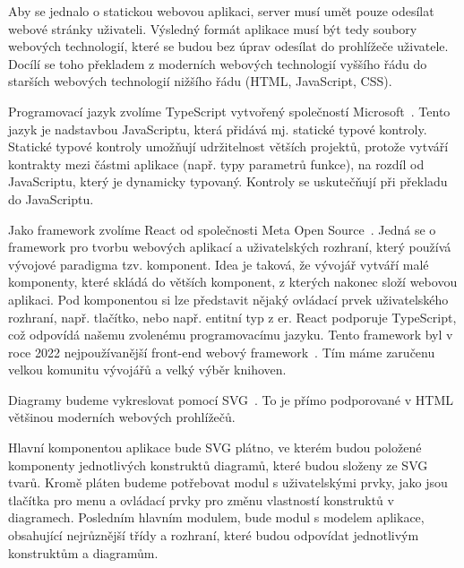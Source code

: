 Aby se jednalo o statickou webovou aplikaci, server musí umět pouze odesílat webové stránky uživateli.
Výsledný formát aplikace musí být tedy soubory webových technologií, které se budou bez úprav odesílat do prohlížeče uživatele.
Docílí se toho překladem z moderních webových technologií vyššího řádu do starších webových technologií nižšího řádu (HTML, JavaScript, CSS).

Programovací jazyk zvolíme TypeScript vytvořený společností Microsoft~\cite{microsoft_typescriptjavascript_2023}.
Tento jazyk je nadstavbou JavaScriptu, která přidává mj. statické typové kontroly.
Statické typové kontroly umožňují udržitelnost větších projektů, protože vytváří kontrakty mezi částmi aplikace (např. typy parametrů funkce), na rozdíl od JavaScriptu, který je dynamicky typovaný.
Kontroly se uskutečňují při překladu do JavaScriptu.

Jako framework zvolíme React od společnosti Meta Open Source~\cite{react_2023}.
Jedná se o framework pro tvorbu webových aplikací a uživatelských rozhraní, který používá vývojové paradigma tzv. komponent.
Idea je taková, že vývojář vytváří malé komponenty, které skládá do větších komponent, z kterých nakonec složí webovou aplikaci.
Pod komponentou si lze představit nějaký ovládací prvek uživatelského rozhraní, např. tlačítko, nebo např. entitní typ z \acrshort{er}.
React podporuje TypeScript, což odpovídá našemu zvolenému programovacímu jazyku.
Tento framework byl v roce 2022 nejpoužívanější front-end webový framework~\cite{stackoverflow_developersurvey_2022}.
Tím máme zaručenu velkou komunitu vývojářů a velký výběr knihoven.

Diagramy budeme vykreslovat pomocí SVG~\cite{brinza_svg_2018}.
To je přímo podporované v HTML většinou moderních webových prohlížečů.

Hlavní komponentou aplikace bude SVG plátno, ve kterém budou položené komponenty jednotlivých konstruktů diagramů, které budou složeny ze SVG tvarů.
Kromě pláten budeme potřebovat modul s uživatelskými prvky, jako jsou tlačítka pro menu a ovládací prvky pro změnu vlastností konstruktů v diagramech.
Posledním hlavním modulem, bude modul s modelem aplikace, obsahující nejrůznější třídy a rozhraní, které budou odpovídat jednotlivým konstruktům a diagramům.
